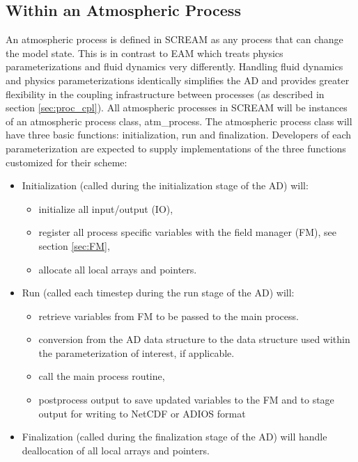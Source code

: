 \subsection{Within an Atmospheric Process}
\label{sec:atmproc}
An atmospheric process is defined in SCREAM as any process that can change the model state.  This is in contrast to EAM which treats physics parameterizations and fluid dynamics very differently.  Handling fluid dynamics and physics parameterizations identically simplifies the AD and provides greater flexibility in the coupling infrastructure between processes (as described in section \ref{sec:proc_cpl}).  All atmospheric processes in SCREAM will be instances of an atmospheric process class, atm\_process.  The atmospheric process class will have three basic functions: initialization, run and finalization.  Developers of each parameterization are expected to supply implementations of the three functions customized for their scheme: 
\begin{itemize}
\item Initialization (called during the initialization stage of the AD) will:
	\begin{itemize}
	\item initialize all input/output (IO),
	\item register all process specific variables with the field manager (FM), see section \ref{sec:FM},
	\item allocate all local arrays and pointers. 
	\end{itemize}
\item Run (called each timestep during the run stage of the AD) will:
	\begin{itemize}
	\item retrieve variables from FM to be passed to the main process.
	\item conversion from the AD data structure to the data structure used within the parameterization of interest, if applicable.
	\item call the main process routine,
	\item postprocess output to save updated variables to the FM and to stage output for writing to NetCDF or ADIOS format
	\end{itemize}
\item Finalization (called during the finalization stage of the AD) will handle deallocation of all local arrays and pointers.
\end{itemize}


